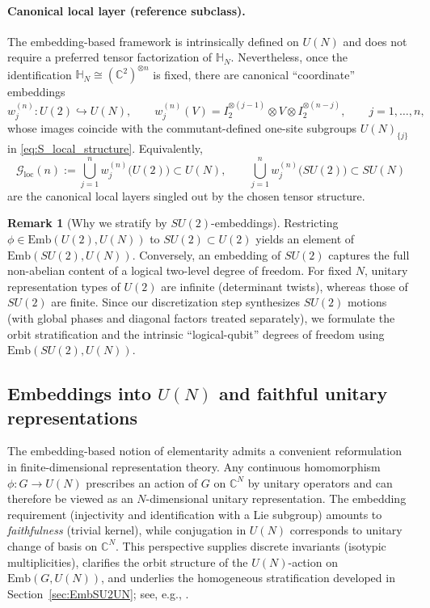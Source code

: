 \documentclass{article}%
\theoremstyle{definition}
\newtheorem{remark}[theorem]{Remark}
\numberwithin{equation}{section}
\newcommand{\C}{\mathbb{C}}
\newcommand{\Emb}{\mathrm{Emb}}
\begin{document}
\paragraph{Canonical local layer (reference subclass).}
The embedding-based framework is intrinsically defined on $U(N)$ and does not require a preferred
tensor factorization of $\mathbb{H}_N$. Nevertheless, once the identification
$\mathbb{H}_N\cong(\mathbb{C}^2)^{\otimes n}$ is fixed, there are canonical ``coordinate'' embeddings
\[
w_j^{(n)}:U(2)\hookrightarrow U(N),\qquad
w_j^{(n)}(V)=I_2^{\otimes (j-1)}\otimes V\otimes I_2^{\otimes (n-j)},\qquad j=1,\dots,n,
\]
whose images coincide with the commutant-defined one-site subgroups $U(N)_{\{j\}}$ in
\eqref{eq:S_local_structure}. Equivalently,
\[
\mathcal{G}_{\mathrm{loc}}(n):=\bigcup_{j=1}^n w_j^{(n)}\big(U(2)\big)\subset U(N),
\qquad
\bigcup_{j=1}^n w_j^{(n)}\big(SU(2)\big)\subset SU(N)
\]
are the canonical local layers singled out by the chosen tensor structure.

\begin{remark}[Why we stratify by $SU(2)$-embeddings]\label{rem:U2_vs_SU2}
Restricting $\phi\in\Emb(U(2),U(N))$ to $SU(2)\subset U(2)$ yields an element of $\Emb(SU(2),U(N))$.
Conversely, an embedding of $SU(2)$ captures the full non-abelian content of a logical two-level
degree of freedom. For fixed $N$, unitary representation types of $U(2)$ are infinite (determinant
twists), whereas those of $SU(2)$ are finite. Since our discretization step synthesizes $SU(2)$
motions (with global phases and diagonal factors treated separately), we formulate the orbit
stratification and the intrinsic ``logical-qubit'' degrees of freedom using $\Emb(SU(2),U(N))$.
\end{remark}


\subsection{Embeddings into \texorpdfstring{$U(N)$}{U(N)} and faithful unitary representations}
\label{subsec:embeddings_representations}
The embedding-based notion of elementarity admits a convenient reformulation in finite-dimensional
representation theory. Any continuous homomorphism $\phi:G\to U(N)$ prescribes an action of $G$ on
$\C^N$ by unitary operators and can therefore be viewed as an $N$-dimensional unitary representation.
The embedding requirement (injectivity and identification with a Lie subgroup) amounts to
\emph{faithfulness} (trivial kernel), while conjugation in $U(N)$ corresponds to unitary change of
basis on $\C^N$. This perspective supplies discrete invariants (isotypic multiplicities), clarifies
the orbit structure of the $U(N)$-action on $\Emb(G,U(N))$, and underlies the homogeneous
stratification developed in Section~\ref{sec:EmbSU2UN}; see, e.g., \cite{Hall2015,BrockerDieck1985,Knapp2002}.
\end{document}
